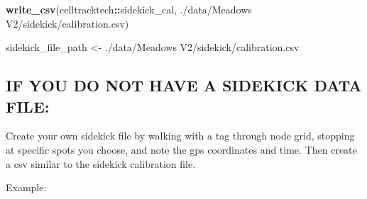 \documentclass[
]{book}
\newenvironment{Shaded}{\begin{snugshade}}{\end{snugshade}}
\newcommand{\FunctionTok}[1]{\textcolor[rgb]{0.13,0.29,0.53}{\textbf{#1}}}
\newcommand{\NormalTok}[1]{#1}
\newcommand{\OtherTok}[1]{\textcolor[rgb]{0.56,0.35,0.01}{#1}}
\newcommand{\SpecialCharTok}[1]{\textcolor[rgb]{0.81,0.36,0.00}{\textbf{#1}}}
\newcommand{\StringTok}[1]{\textcolor[rgb]{0.31,0.60,0.02}{#1}}
\begin{document}
\begin{Shaded}
\begin{Highlighting}[]
\FunctionTok{write\_csv}\NormalTok{(celltracktech}\SpecialCharTok{::}\NormalTok{sidekick\_cal, }\StringTok{\textquotesingle{}./data/Meadows V2/sidekick/calibration.csv\textquotesingle{}}\NormalTok{)}

\NormalTok{sidekick\_file\_path }\OtherTok{\textless{}{-}} \StringTok{\textquotesingle{}./data/Meadows V2/sidekick/calibration.csv\textquotesingle{}}
\end{Highlighting}
\end{Shaded}

\subsection{IF YOU DO NOT HAVE A SIDEKICK DATA FILE:}\label{if-you-do-not-have-a-sidekick-data-file}

Create your own sidekick file by walking with a tag through node grid, stopping at specific spots you choose, and note the gps coordinates and time. Then create a csv similar to the sidekick calibration file.

Example:
\end{document}

